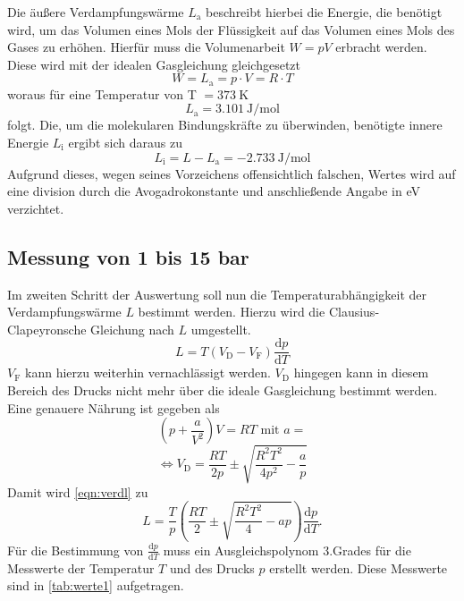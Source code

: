 \noindent
Die äußere Verdampfungswärme $L_{\text{a}}$ beschreibt hierbei die Energie, die benötigt wird, um das Volumen eines Mols der Flüssigkeit auf das Volumen eines Mols des Gases zu
erhöhen. Hierfür muss die Volumenarbeit $W = pV$ erbracht werden. Diese wird mit der idealen Gasgleichung gleichgesetzt
\begin{equation*}
  W = L_{\text{a}} = p\cdot V = R \cdot T
\end{equation*}
woraus für eine Temperatur von T $= \SI{373}{\kelvin}$ 
\begin{equation*}
  L_{\text{a}} = \SI{3,101}{\joule\per\mole}  %
\end{equation*}
folgt.
\newline
Die, um die molekularen Bindungskräfte zu überwinden, benötigte innere Energie $L_{\text{i}}$ ergibt sich daraus zu
\begin{equation*}
  L_{\text{i}} = L - L_{\text{a}} = \SI{-2,733}{\joule\per\mole}  %
\end{equation*}
Aufgrund dieses, wegen seines Vorzeichens offensichtlich falschen, Wertes wird auf eine division durch die Avogadrokonstante und anschließende Angabe in eV verzichtet.

\subsection{Messung von 1 bis 15 bar}
Im zweiten Schritt der Auswertung soll nun die Temperaturabhängigkeit der Verdampfungswärme $L$ bestimmt werden. Hierzu wird die Clausius-Clapeyronsche Gleichung nach $L$ umgestellt.
\begin{equation}
  L = T(V_{\text{D}} - V_{\text{F}})\frac{\mathrm{d}p}{\mathrm{d}T}   %
  \label{eqn:verdl}
\end{equation}
$V_{\text{F}}$ kann hierzu weiterhin vernachlässigt werden. $V_{\text{D}}$ hingegen kann in diesem Bereich des Drucks nicht mehr über die ideale Gasgleichung bestimmt werden.
Eine genauere Nährung ist gegeben als 
\begin{equation*}
  \left(p+\frac{a}{V^2}\right)V = RT \, \, \mathrm{mit} \, \, a =  %
\end{equation*}
\begin{equation*}
  \Leftrightarrow V_{\text{D}} = \frac{RT}{2p} \pm \sqrt{\frac{R^2T^2}{4p^2}-\frac{a}{p}}
\end{equation*}
Damit wird \ref{eqn:verdl} zu
\begin{equation}
  L = \frac{T}{p} \left(\frac{RT}{2} \pm \sqrt{\frac{R^2T^2}{4}-ap}\right)\frac{\mathrm{d}p}{\mathrm{d}T}. %
  \label{eqn:verdl2}
\end{equation}
Für die Bestimmung von $\frac{\mathrm{d}p}{\mathrm{d}T}$ muss ein Ausgleichspolynom 3.Grades für die Messwerte der Temperatur $T$ und des Drucks $p$ erstellt werden. 
Diese Messwerte sind in \autoref{tab:werte1} aufgetragen.

